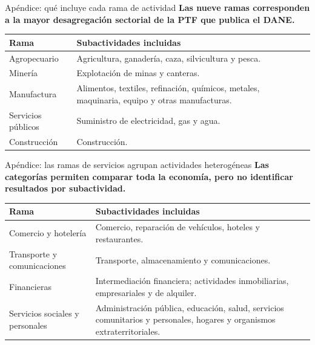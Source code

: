 \documentclass[aspectratio=169,11pt]{beamer}
\newcommand{\fuente}[1]{\vspace{0.10cm}{\tiny\color{cjcgray}#1}}
\newcommand{\idea}[1]{\textbf{\color{cjcblue}#1}}
\begin{document}
\begin{frame}{Apéndice: qué incluye cada rama de actividad}
  \idea{Las nueve ramas corresponden a la mayor desagregación sectorial de la PTF que publica el DANE.}

  \vspace{0.18cm}
  \begin{center}
  \scriptsize
  \setlength{\tabcolsep}{4pt}
  \begin{tabular}{@{}>{\raggedright\arraybackslash}p{3.0cm}>{\raggedright\arraybackslash}p{10.5cm}@{}}
    \toprule
    Rama & Subactividades incluidas \\
    \midrule
    Agropecuario & Agricultura, ganadería, caza, silvicultura y pesca. \\
    \addlinespace
    Minería & Explotación de minas y canteras. \\
    \addlinespace
    Manufactura & Alimentos, textiles, refinación, químicos, metales, maquinaria, equipo y otras manufacturas. \\
    \addlinespace
    Servicios públicos & Suministro de electricidad, gas y agua. \\
    \addlinespace
    Construcción & Construcción. \\
    \bottomrule
  \end{tabular}
  \end{center}

  \fuente{Fuente: DANE.}
\end{frame}

\begin{frame}{Apéndice: las ramas de servicios agrupan actividades heterogéneas}
  \idea{Las categorías permiten comparar toda la economía, pero no identificar resultados por subactividad.}

  \vspace{0.18cm}
  \begin{center}
  \scriptsize
  \setlength{\tabcolsep}{4pt}
  \begin{tabular}{@{}>{\raggedright\arraybackslash}p{3.2cm}>{\raggedright\arraybackslash}p{10.3cm}@{}}
    \toprule
    Rama & Subactividades incluidas \\
    \midrule
    Comercio y hotelería & Comercio, reparación de vehículos, hoteles y restaurantes. \\
    \addlinespace
    Transporte y comunicaciones & Transporte, almacenamiento y comunicaciones. \\
    \addlinespace
    Financieras & Intermediación financiera; actividades inmobiliarias, empresariales y de alquiler. \\
    \addlinespace
    Servicios sociales y personales & Administración pública, educación, salud, servicios comunitarios y personales, hogares y organismos extraterritoriales. \\
    \bottomrule
  \end{tabular}
  \end{center}

  \fuente{Fuente: DANE.}
\end{frame}
\end{document}
